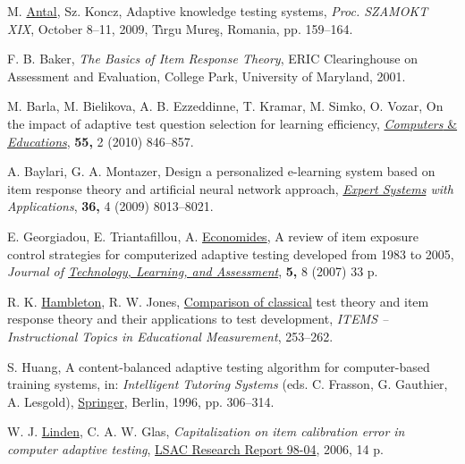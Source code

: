 \documentclass[11pt,twoside]{article}
\begin{document}
\newpage
\begin{thebibliography}{99}   
M. \href{http://www.ms.sapientia.ro/~manyi/}{Antal}, Sz. Koncz, Adaptive knowledge testing systems, \emph{Proc. SZAMOKT XIX}, October 8--11, 2009, T\^{\i}rgu Mure\c s, Romania,  pp. 159--164.

F. B. Baker, \textit{The Basics of Item Response Theory}, ERIC Clearinghouse on Assessment and Evaluation, College Park, University of Maryland, 2001.

 M. Barla, M. Bielikova, A. B. Ezzeddinne, T. Kramar, M. Simko, O. Vozar,  On the impact of adaptive test question selection for learning efficiency, \href{http://www.sciencedirect.com/science/journal/03601315}{\textit{Computers} \& \textit{Educations}}, \textbf{55,} 2 (2010) 846--857.

A. Baylari, G. A. Montazer, Design a personalized e-learning system based on item response theory and artificial neural network approach, \textit{\href{http://www.sciencedirect.com/science/journal/09574174}{Expert Systems} with Applications},  \textbf{36,} 4 (2009) 8013--8021. 


 E. Georgiadou, E. Triantafillou, A. \href{http://conta.uom.gr/conta/CV/EconomidesCV-en.pdf}{Economides}, A review of item exposure control strategies for computerized adaptive testing developed from 1983 to 2005, 
\textit{Journal of \href{http://escholarship.bc.edu/jtla/}{Technology, Learning, and Assessment}}, \textbf{5,} 8 (2007) 33 p.

R. K. \href{http://www.labmeeting.com/papers/author/hambleton-rk}{Hambleton}, R. W. Jones, \href{http://www.ncme.org/pubs/items/24.pdf}{Comparison of classical} 
test theory and item response theory and their applications to test development, \textit{ITEMS -- Instructional Topics in Educational Measurement}, 253--262.

 S. Huang, A content-balanced adaptive testing algorithm for computer-based training systems, in: \textit{Intelligent Tutoring Systems} (eds. C. Frasson, G. Gauthier, A. Lesgold),  \href{http://www.springer.com/?SGWID=0-102-0-0-0}{Springer}, Berlin, 1996, pp. 306--314.

W. J. \href{http://www.utwente.nl/gw/omd/afdeling/vanderlinden/}{Linden}, C. A. W. Glas, \textit{Capitalization on item calibration error in computer adaptive testing}, 
\href{http://lsac.biz/LSACResources/Research/CT/CT-98-04.pdf}{LSAC Research Report 98-04}, 2006, 14 p.


\end{thebibliography}
\end{document}
